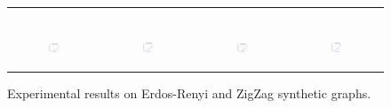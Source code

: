 \begin{figure}[ht]
\begin{tabular}{cccc}
\begin{subfigure}[b]{0.22\textwidth}
			\caption{}
			\label{appfig:diffFA_CF2G_zigzag_setcover}
	  \end{subfigure} \\
	  \begin{subfigure}[b]{0.22\textwidth}
	  	\includegraphics[width=110pt]{images/validated_CC2G_bigsynthetic_maxgraphcut.pdf}
			\caption{}
			\label{appfig:validated_CC2G_bigsynthetic_maxgraphcut}
	  \end{subfigure} &
	  \begin{subfigure}[b]{0.22\textwidth}
	  	\includegraphics[width=110pt]{images/validated_CC2G_bigsynthetic_setcover.pdf}
			\caption{}
			\label{appfig:validated_CC2G_bigsynthetic_setcover}
	  \end{subfigure} &
	  \begin{subfigure}[b]{0.22\textwidth}
	  	\includegraphics[width=110pt]{images/validated_CC2G_zigzag_maxgraphcut.pdf}
			\caption{}
			\label{appfig:validated_CC2G_zigzag_maxgraphcut}
	  \end{subfigure} &
	  \begin{subfigure}[b]{0.22\textwidth}
	  	\includegraphics[width=110pt]{images/validated_CC2G_zigzag_setcover.pdf}
			\caption{}
			\label{appfig:validated_CC2G_zigzag_setcover}
	  \end{subfigure} \\
  \end{tabular}
  \caption{Experimental results on Erdos-Renyi and ZigZag synthetic graphs.}
\end{figure}


